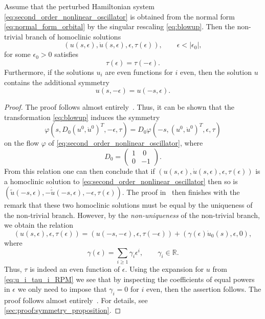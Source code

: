 \begin{proposition}
    \label{proposition:symmetry}
    Assume that the perturbed Hamiltonian system
    \cref{eq:second_order_nonlinear_oscillator} is obtained from the normal form
    \cref{eq:normal_form_orbital} by the singular rescaling
    \cref{eq:blowup}. Then the non-trivial branch of homoclinic solutions 
    \[
        (u(s,\epsilon), \dot u(s, \epsilon), \epsilon, \tau(\epsilon)),
            \qquad \epsilon<|\epsilon_0|,
    \]
    for some $\epsilon_0>0$ satisfies
    \begin{equation}
        \label{eq:tau}
        \tau(\epsilon) = \tau(-\epsilon).
    \end{equation}
    Furthermore, if the solutions $u_i$ are even functions for $i$ even, then 
    the solution $u$ contains the additional symmetry
    \[
        u(s,-\epsilon) = u(-s,\epsilon)
    .\] 
\end{proposition}
\begin{proof}
    \ifthesis
    The proof follows almost entirely~\cite[Proposition 4.2]{Beyn_1994}. Thus,
    it can be shown that the transformation \cref{eq:blowup} induces the
    symmetry
    \[
        \varphi(s, D_0 (u^0, \dot u^0)^T, -\epsilon, \tau)
        =
        D_0 \varphi(-s, (u^0, \dot u^0)^T, \epsilon, \tau)
    \] 
    on the flow $\varphi$ of \cref{eq:second_order_nonlinear_oscillator}, where 
    \[
        D_0 = \begin{pmatrix} 1 & ~0 \\  0 & -1 \end{pmatrix}.
    \] 
    From this relation one can then conclude that if $(u(s,\epsilon), \dot
    u(s,\epsilon), \epsilon, \tau(\epsilon))$ is a homoclinic solution to
    \cref{eq:second_order_nonlinear_oscillator} then so is $(\tilde
    u(-s,\epsilon), -\dot{\tilde{u}}(-s,\epsilon), -\epsilon, \tau(\epsilon))$.
    The proof in~\cite{Beyn_1994} then finishes with the remark that these two
    homoclinic solutions must be equal by the uniqueness of the non-trivial
    branch. However, by the \emph{non-uniqueness} of the non-trivial branch, we
    obtain the relation
    \[
        (u(s,\epsilon), \epsilon, \tau(\epsilon))
        =
        (u(-s,-\epsilon), \epsilon, \tau(-\epsilon))
        +
        (\gamma(\epsilon) \dot u_0(s), \epsilon, 0),
    \]
    where
    \begin{equation}
        \label{eq:gamma}
        \gamma(\epsilon) = \sum_{i\geq 1} \gamma_i \epsilon^i,
        \qquad
        \gamma_i \in \mathbb R.
    \end{equation}
    Thus, $\tau$ is indeed an even function of $\epsilon$. Using the expansion
    for $u$ from \cref{eq:u_i_tau_i_RPM} we see that by inspecting the
    coefficients of equal powers in $\epsilon$ we only need to impose that
    $\gamma_i=0$ for $i$ even, then the assertion follows.
    \else
    The proof follows almost entirely~\cite[Proposition 4.2]{Beyn_1994}. For
    details, see \cref{sec:proof:symmetry_proposition}.
    \fi
\end{proof}

